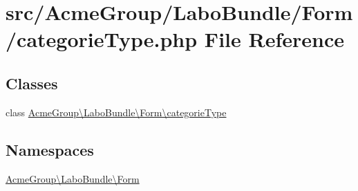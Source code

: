 \hypertarget{categorie_type_8php}{\section{src/\+Acme\+Group/\+Labo\+Bundle/\+Form/categorie\+Type.php File Reference}
\label{categorie_type_8php}
}
\subsection*{Classes}
\begin{DoxyCompactItemize}
\item 
class \hyperlink{class_acme_group_1_1_labo_bundle_1_1_form_1_1categorie_type}{Acme\+Group\textbackslash{}\+Labo\+Bundle\textbackslash{}\+Form\textbackslash{}categorie\+Type}
\end{DoxyCompactItemize}
\subsection*{Namespaces}
\begin{DoxyCompactItemize}
\item 
 \hyperlink{namespace_acme_group_1_1_labo_bundle_1_1_form}{Acme\+Group\textbackslash{}\+Labo\+Bundle\textbackslash{}\+Form}
\end{DoxyCompactItemize}

